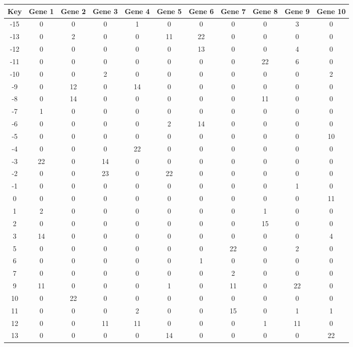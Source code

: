 \begin{tabular}{|c|c|c|c|c|c|c|c|c|c|c|}
\hline
Key & Gene 1 & Gene 2 & Gene 3 & Gene 4 & Gene 5 & Gene 6 & Gene 7 & Gene 8 & Gene 9 & Gene 10 \\
\hline
-15 & 0 & 0 & 0 & 1 & 0 & 0 & 0 & 0 & 3 & 0 \\
-13 & 0 & 2 & 0 & 0 & 11 & 22 & 0 & 0 & 0 & 0 \\
-12 & 0 & 0 & 0 & 0 & 0 & 13 & 0 & 0 & 4 & 0 \\
-11 & 0 & 0 & 0 & 0 & 0 & 0 & 0 & 22 & 6 & 0 \\
-10 & 0 & 0 & 2 & 0 & 0 & 0 & 0 & 0 & 0 & 2 \\
-9 & 0 & 12 & 0 & 14 & 0 & 0 & 0 & 0 & 0 & 0 \\
-8 & 0 & 14 & 0 & 0 & 0 & 0 & 0 & 11 & 0 & 0 \\
-7 & 1 & 0 & 0 & 0 & 0 & 0 & 0 & 0 & 0 & 0 \\
-6 & 0 & 0 & 0 & 0 & 2 & 14 & 0 & 0 & 0 & 0 \\
-5 & 0 & 0 & 0 & 0 & 0 & 0 & 0 & 0 & 0 & 10 \\
-4 & 0 & 0 & 0 & 22 & 0 & 0 & 0 & 0 & 0 & 0 \\
-3 & 22 & 0 & 14 & 0 & 0 & 0 & 0 & 0 & 0 & 0 \\
-2 & 0 & 0 & 23 & 0 & 22 & 0 & 0 & 0 & 0 & 0 \\
-1 & 0 & 0 & 0 & 0 & 0 & 0 & 0 & 0 & 1 & 0 \\
0 & 0 & 0 & 0 & 0 & 0 & 0 & 0 & 0 & 0 & 11 \\
1 & 2 & 0 & 0 & 0 & 0 & 0 & 0 & 1 & 0 & 0 \\
2 & 0 & 0 & 0 & 0 & 0 & 0 & 0 & 15 & 0 & 0 \\
3 & 14 & 0 & 0 & 0 & 0 & 0 & 0 & 0 & 0 & 4 \\
5 & 0 & 0 & 0 & 0 & 0 & 0 & 22 & 0 & 2 & 0 \\
6 & 0 & 0 & 0 & 0 & 0 & 1 & 0 & 0 & 0 & 0 \\
7 & 0 & 0 & 0 & 0 & 0 & 0 & 2 & 0 & 0 & 0 \\
9 & 11 & 0 & 0 & 0 & 1 & 0 & 11 & 0 & 22 & 0 \\
10 & 0 & 22 & 0 & 0 & 0 & 0 & 0 & 0 & 0 & 0 \\
11 & 0 & 0 & 0 & 2 & 0 & 0 & 15 & 0 & 1 & 1 \\
12 & 0 & 0 & 11 & 11 & 0 & 0 & 0 & 1 & 11 & 0 \\
13 & 0 & 0 & 0 & 0 & 14 & 0 & 0 & 0 & 0 & 22 \\
\hline
\end{tabular}